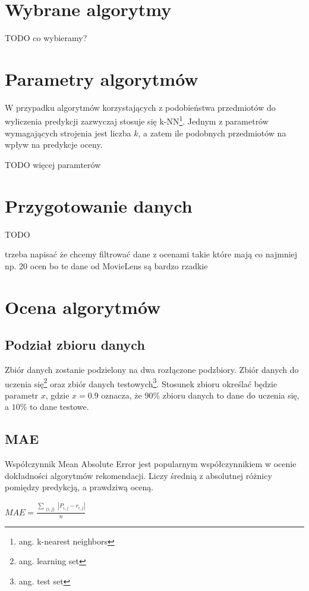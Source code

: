 \documentclass[12pt, a4paper]{article}
\begin{document}
\section{Wybrane algorytmy}
TODO co wybieramy?

\section{Parametry algorytmów}
W przypadku algorytmów korzystających z podobieństwa przedmiotów do wyliczenia predykcji zazwyczaj stosuje się k-NN\footnote{ang. k-nearest neighbors}. Jednym z parametrów wymagających strojenia jest liczba $k$, a zatem ile podobnych przedmiotów na wpływ na predykcje oceny.

TODO więcej paramterów

\section{Przygotowanie danych}
TODO

trzeba napisać że chcemy filtrować dane z ocenami takie które mają co najmniej np. 20
 ocen bo te dane od MovieLens są
 bardzo rzadkie

\section{Ocena algorytmów}

\subsection{Podział zbioru danych}
Zbiór danych zostanie podzielony na dwa rozłączone podzbiory. Zbiór danych do uczenia się\footnote{ang. learning set} oraz zbiór danych testowych\footnote{ang. test set}. Stosunek zbioru określać będzie parametr $x$, gdzie $x = 0.9$ oznacza, że $90\%$ zbioru danych to dane do uczenia się, a $10\%$ to dane testowe.

\subsection{MAE}
Współczynnik Mean Absolute Error jest popularnym współczynnikiem w ocenie dokładności algorytmów rekomendacji. Liczy średnią z absolutnej różnicy pomiędzy predykcją, a prawdziwą oceną.

\begin{math}
MAE = \frac{
	\sum_{\substack{
   \{i, j\}
  }}
  |P_{i,j} - r_{i,j}|
}{n}
\end{math}
\end{document}
